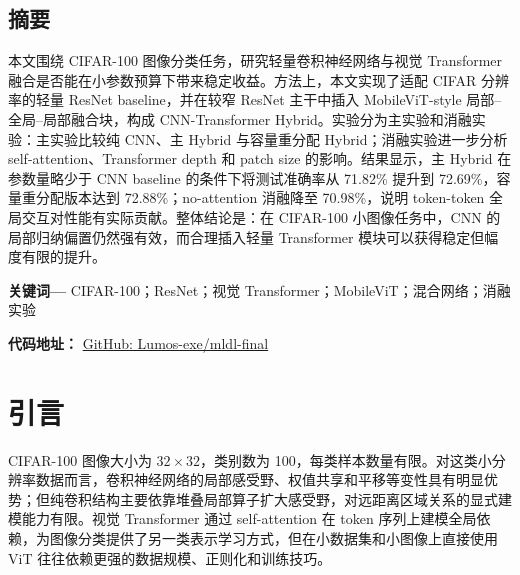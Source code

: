\documentclass[UTF8,letterpaper,twocolumn]{ctexart}
\begin{document}

\begin{center}
\begin{minipage}{0.92\columnwidth}
\section*{摘要}
本文围绕 CIFAR-100 图像分类任务，研究轻量卷积神经网络与视觉 Transformer 融合是否能在小参数预算下带来稳定收益。方法上，本文实现了适配 CIFAR 分辨率的轻量 ResNet baseline，并在较窄 ResNet 主干中插入 MobileViT-style 局部--全局--局部融合块，构成 CNN-Transformer Hybrid。实验分为主实验和消融实验：主实验比较纯 CNN、主 Hybrid 与容量重分配 Hybrid；消融实验进一步分析 self-attention、Transformer depth 和 patch size 的影响。结果显示，主 Hybrid 在参数量略少于 CNN baseline 的条件下将测试准确率从 71.82\% 提升到 72.69\%，容量重分配版本达到 72.88\%；no-attention 消融降至 70.98\%，说明 token-token 全局交互对性能有实际贡献。整体结论是：在 CIFAR-100 小图像任务中，CNN 的局部归纳偏置仍然强有效，而合理插入轻量 Transformer 模块可以获得稳定但幅度有限的提升。

\noindent\textbf{关键词---} CIFAR-100；ResNet；视觉 Transformer；MobileViT；混合网络；消融实验

\vspace{0.3em}
\noindent\textbf{代码地址：}
\href{https://github.com/Lumos-exe/mldl-final}{GitHub: Lumos-exe/mldl-final}
\end{minipage}
\end{center}
\vspace{0.8em}

\section{引言}
CIFAR-100 图像大小为 $32\times32$，类别数为 100，每类样本数量有限。对这类小分辨率数据而言，卷积神经网络的局部感受野、权值共享和平移等变性具有明显优势；但纯卷积结构主要依靠堆叠局部算子扩大感受野，对远距离区域关系的显式建模能力有限。视觉 Transformer 通过 self-attention 在 token 序列上建模全局依赖，为图像分类提供了另一类表示学习方式，但在小数据集和小图像上直接使用 ViT 往往依赖更强的数据规模、正则化和训练技巧。
\end{document}
